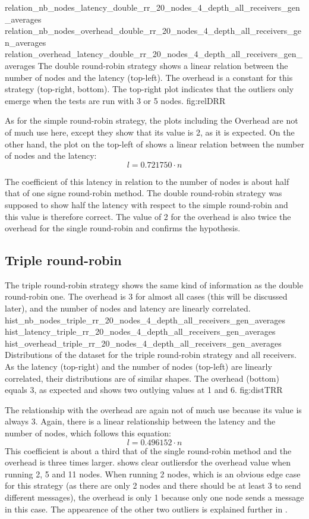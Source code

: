 \triplefigure
    {relation_nb_nodes_latency_double_rr_20_nodes_4_depth_all_receivers_gen_averages}
    {relation_nb_nodes_overhead_double_rr_20_nodes_4_depth_all_receivers_gen_averages}
    {relation_overhead_latency_double_rr_20_nodes_4_depth_all_receivers_gen_averages}
    {The double round-robin strategy shows a linear relation between the number of
    nodes and the latency (top-left). The overhead is a constant for this
    strategy (top-right, bottom). The top-right plot indicates that the outliers
    only emerge when the tests are run with 3 or 5 nodes.}
    {fig:relDRR}

As for the simple round-robin strategy, the plots including the Overhead are not
of much use here, except they show that its value is 2, as it is expected. 
On the other hand, the plot on the top-left of  shows a
linear relation between the number of nodes and the latency: 
\[l = 0.721750 \cdot n\]

The coefficient of this latency in relation to the number of nodes is about half
that of one signe round-robin method. The double round-robin strategy was
supposed to show half the latency with respect to the simple round-robin and
this value is therefore correct. The value of 2 for the overhead is also twice
the overhead for the single round-robin and confirms the hypothesis.
    

\FloatBarrier
\subsection{Triple round-robin}
\label{ssec:tripleRR}
The triple round-robin strategy shows  the same kind of information as the
double round-robin one. The overhead is 3 for almost all cases (this will be
discussed later), and the number of nodes and latency are linearly correlated.
\triplefigure
    {hist_nb_nodes_triple_rr_20_nodes_4_depth_all_receivers_gen_averages}
    {hist_latency_triple_rr_20_nodes_4_depth_all_receivers_gen_averages}
    {hist_overhead_triple_rr_20_nodes_4_depth_all_receivers_gen_averages}
    {Distributions of the dataset for the triple round-robin strategy and all
    receivers. As the latency (top-right) and the number of nodes (top-left) are
    linearly correlated, their distributions are of similar shapes. The
    overhead (bottom) equals 3, as expected and shows two outlying values at 1
    and 6.}
    {fig:distTRR}

The relationship with the overhead are again not of much use because its value
is always 3. Again, there is a linear relationship between the latency and the
number of nodes, which follows this equation:
    \[l = 0.496152 \cdot n\]
This coefficient is about a third that of the single round-robin method and the
overhead is three times larger.
 shows clear outliersfor the overhead value when running
2, 5 and 11 nodes. When running 2 nodes, which is an obvious edge case for this
strategy (as there are only 2 nodes and there should be at least 3 to send
different messages), the overhead is only 1 because only one node sends a
message in this case. The appearence of the other two outliers is explained further in
. 

